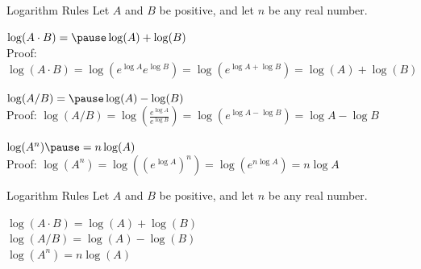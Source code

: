 \begin{frame}[t]
\begin{block}{Logarithm Rules}
Let $A$ and $B$ be positive, and let $n$ be any real number.\pause

{$\log(A \cdot B) = \pause \log(A)+ \log(B)$\\}
{\textcolor{answercolor}{Proof:  $\log(A \cdot B) = \log(e^{\log A}e^{\log B})=\log(e^{\log A+\log B})=\log(A)+\log(B)$
\vfill}}\pause

{$\log(A/B) =\pause \log(A)-\log(B)$\\
\textcolor{answercolor}{Proof: $\log(A/B) = \log\left(\frac{e^{\log A}}{e^{\log B}}\right) = \log(e^{\log A - \log B}) = \log A - \log B$ 
\vfill}}\pause

{$\log (A^n) \pause = n\log (A)$}\\
\textcolor{answercolor}{Proof: $\log(A^n)=\log\left(\left(e^{\log A}\right)^n\right)=\log\left(e^{n\log A}\right)=n\log A$}
\end{block}
\end{frame}
\begin{frame}[t]
\begin{block}{Logarithm Rules}
Let $A$ and $B$ be positive, and let $n$ be any real number.

$\log(A \cdot B) =  \log(A)+ \log(B)$\\
$\log(A/B) = \log(A)-\log(B)$\\
$\log (A^n)  = n\log (A)$\\
\end{block}\pause

\vspace{.3cm}
\pause
\color{answercolor}
\end{frame}
